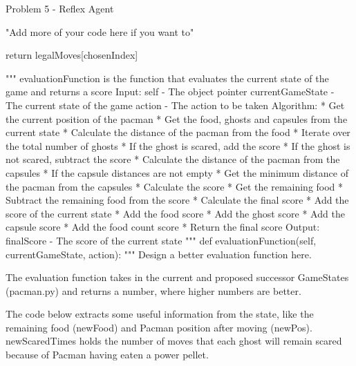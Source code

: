 \begin{problem}{Problem 5 - Reflex Agent}
\begin{highlight}[Solution]
\begin{code}[Python]
        "Add more of your code here if you want to"

        return legalMoves[chosenIndex]

    """ evaluationFunction is the function that evaluates the current state of the game and returns a score
        Input:
            self - The object pointer
            currentGameState - The current state of the game
            action - The action to be taken
        Algorithm:
            * Get the current position of the pacman
            * Get the food, ghosts and capsules from the current state
            * Calculate the distance of the pacman from the food
            * Iterate over the total number of ghosts
            * If the ghost is scared, add the score
            * If the ghost is not scared, subtract the score
            * Calculate the distance of the pacman from the capsules
            * If the capsule distances are not empty
            * Get the minimum distance of the pacman from the capsules
            * Calculate the score
            * Get the remaining food
            * Subtract the remaining food from the score
            * Calculate the final score
            * Add the score of the current state
            * Add the food score
            * Add the ghost score
            * Add the capsule score
            * Add the food count score
            * Return the final score
        Output:
            finalScore - The score of the current state
    """
    def evaluationFunction(self, currentGameState, action):
        """
        Design a better evaluation function here.

        The evaluation function takes in the current and proposed successor
        GameStates (pacman.py) and returns a number, where higher numbers are better.

        The code below extracts some useful information from the state, like the
        remaining food (newFood) and Pacman position after moving (newPos).
        newScaredTimes holds the number of moves that each ghost will remain
        scared because of Pacman having eaten a power pellet.


\end{code}
\end{highlight}
\end{problem}
